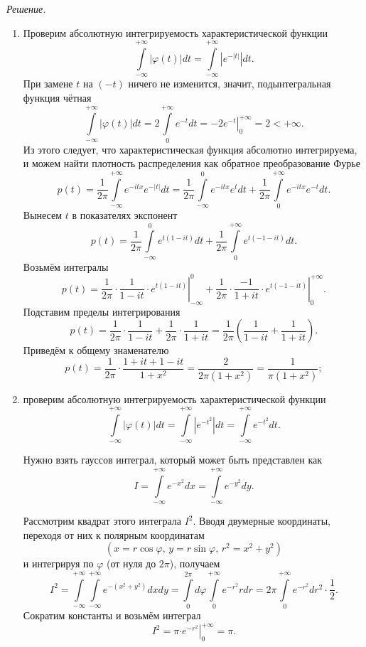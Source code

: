 \textit{Решение.}
\begin{enumerate}[label=\alph*)]
\item Проверим абсолютную интегрируемость характеристической функции
$$ \int \limits_{- \infty }^{+ \infty } \left| \varphi \left( t \right) \right| dt =
  \int \limits_{- \infty }^{+ \infty } \left| e^{- \left| t \right| } \right| dt.$$
При замене $t$ на $ \left( - t \right) $ ничего не изменится, значит, подынтегральная функция чётная
$$ \int \limits_{- \infty }^{+ \infty } \left| \varphi \left( t \right) \right| dt =
  2 \int \limits_0^{+ \infty } e^{- t} dt =
  \left. -2e^{- t} \right|_0^{+ \infty } =
  2 <
  + \infty.$$
Из этого следует, что характеристическая функция абсолютно интегрируема,
и можем найти плотность распределения как обратное преобразование Фурье
$$p \left( t \right) =
  \frac{1}{2 \pi } \int \limits_{- \infty }^{+ \infty } e^{- itx} e^{- \left| t \right| } dt =
  \frac{1}{2 \pi }
  \int \limits_{- \infty }^0
    e^{- itx} e^t dt + \frac{1}{2 \pi } \int \limits_0^{+ \infty } e^{- itx} e^{- t} dt.$$
Вынесем $t$ в показателях экспонент
$$p \left( t \right) =
  \frac{1}{2 \pi }
  \int \limits_{- \infty }^0
    e^{t \left( 1 - it \right) } dt + \frac{1}{2 \pi }
  \int \limits_0^{+ \infty } e^{t \left( - 1 - it \right) } dt.$$
Возьмём интегралы
$$p \left( t \right) =
  \frac{1}{2 \pi } \cdot
  \left. \frac{1}{1 - it} \cdot e^{t \left( 1 - it \right) } \right|_{- \infty }^0 +
  \frac{1}{2 \pi } \cdot
  \left. \frac{- 1}{1 + it} \cdot e^{t \left( - 1 - it \right) } \right|_0^{+ \infty }.$$
Подставим пределы интегрирования
$$p \left( t \right) =
  \frac{1}{2 \pi } \cdot \frac{1}{1 - it} + \frac{1}{2 \pi } \cdot \frac{1}{1 + it} =
  \frac{1}{2 \pi } \left( \frac{1}{1 - it} + \frac{1}{1 + it} \right).$$
Приведём к общему знаменателю
$$p \left( t \right) =
  \frac{1}{2 \pi } \cdot \frac{1 + it + 1 - it}{1 + x^2} =
  \frac{2}{2 \pi \left( 1 + x^2 \right) } =
  \frac{1}{ \pi \left( 1 + x^2 \right) };$$
\item проверим абсолютную интегрируемость характеристической функции
$$ \int \limits_{- \infty }^{+ \infty } \left| \varphi \left( t \right) \right| dt =
  \int \limits_{- \infty }^{+ \infty } \left| e^{- t^2} \right| dt =
  \int \limits_{- \infty }^{+ \infty } e^{- t^2} dt.$$

Нужно взять гауссов интеграл, который может быть представлен как
$$I =
  \int \limits_{- \infty }^{+ \infty } e^{- x^2} dx =
  \int \limits_{- \infty }^{+ \infty } e^{- y^2} dy.$$

Рассмотрим квадрат этого интеграла $I^2$.
Вводя двумерные координаты,
переходя от них к полярным координатам
$$ \left( x = r \cos \varphi, \,
  y = r \sin \varphi, \,
  r^2 = x^2 + y^2 \right) $$
и интегрируя по $ \varphi $ (от нуля до $2 \pi $),
получаем
$$I^2 =
  \int \limits_{- \infty }^{+ \infty } \int \limits_{- \infty }^{+ \infty }
    e^{- \left( x^2 + y^2 \right) } dxdy =
  \int \limits_0^{2 \pi } d \varphi \int \limits_0^{+ \infty } e^{- r^2} rdr =
  2 \pi \int \limits_0^{+ \infty } e^{- r^2} dr^2 \cdot \frac{1}{2}.$$
Сократим константы и возьмём интеграл
$$I^2 =
  \pi \left. \cdot e^{- r^2} \right|_0^{+ \infty } =
  \pi.$$


\end{enumerate}
